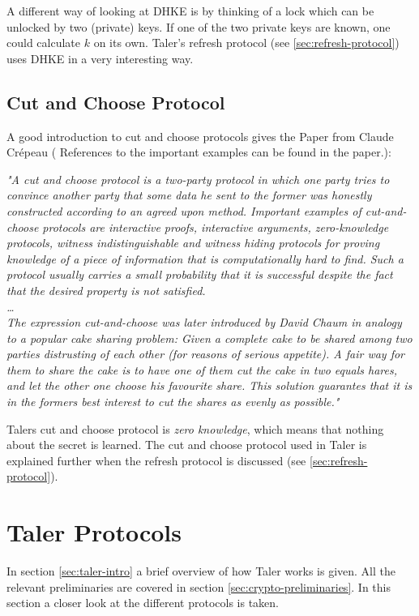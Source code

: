 A different way of looking at \ac{DHKE} is by thinking of a lock which can be unlocked by two (private) keys.
If one of the two private keys are known, one could calculate $k$ on its own.
Taler's refresh protocol (see \ref{sec:refresh-protocol}) uses \ac{DHKE} in a very interesting way.

\subsection{Cut and Choose Protocol}
\label{sec:preliminaries-cut-choose}
A good introduction to cut and choose protocols gives the Paper from Claude Crépeau (\cite{Crépeau2005} References to the important examples can be found in the paper.):
\begin{center}
    \textit{
        "A cut and choose protocol is a two-party protocol in which one party tries to convince another party that some data he sent to the former was honestly constructed according to an agreed upon method.
        Important examples of cut-and-choose protocols are interactive proofs, interactive arguments, zero-knowledge protocols, witness indistinguishable and witness hiding protocols for proving knowledge of a piece of information that is computationally hard to find.
        Such a protocol usually carries a small probability that it is successful despite the fact that the desired property is not satisfied.
        \\\dots\\
        The expression cut-and-choose was later introduced by David Chaum in analogy to a popular cake sharing problem:
        Given a complete cake to be shared among two parties distrusting of each other (for reasons of serious appetite).
        A fair way for them to share the cake is to have one of them cut the cake in two equals hares, and let the other one choose his favourite share.
        This solution guarantes that it is in the formers best interest to cut the shares as evenly as possible."
    }
\end{center}

Talers cut and choose protocol is \textit{zero knowledge}, which means that nothing about the secret is learned.
The cut and choose protocol used in Taler is explained further when the refresh protocol is discussed (see \ref{sec:refresh-protocol}).

\section{Taler Protocols}
In section \ref{sec:taler-intro} a brief overview of how \acl{Taler} works is given. All the relevant preliminaries are covered in section \ref{sec:crypto-preliminaries}.
In this section a closer look at the different protocols is taken.

